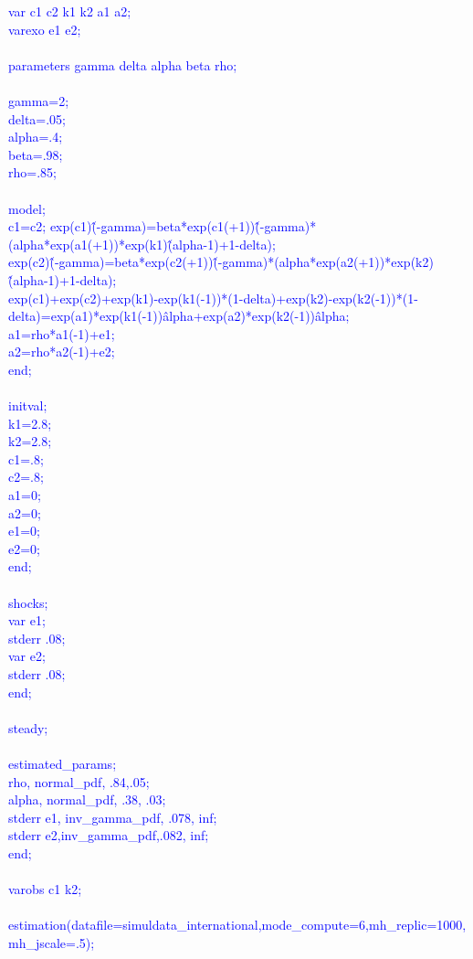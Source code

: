 \documentclass[a4paper,12pt]{scrartcl} %
\begin{document}
\textcolor{blue}{
var c1 c2 k1 k2 a1 a2;\\
varexo e1 e2;\\
\\
parameters gamma delta alpha beta rho;\\
\\
gamma=2;\\
delta=.05;\\
alpha=.4;\\
beta=.98;\\
rho=.85;\\
\\
model;\\
c1=c2;
exp(c1)\^(-gamma)=beta*exp(c1(+1))\^(-gamma)*(alpha*exp(a1(+1))*exp(k1)\^(alpha-1)+1-delta);\\
exp(c2)\^(-gamma)=beta*exp(c2(+1))\^(-gamma)*(alpha*exp(a2(+1))*exp(k2)\^(alpha-1)+1-delta);\\
exp(c1)+exp(c2)+exp(k1)-exp(k1(-1))*(1-delta)+exp(k2)-exp(k2(-1))*(1-delta)=exp(a1)*exp(k1(-1))\^alpha+exp(a2)*exp(k2(-1))\^alpha;\\
a1=rho*a1(-1)+e1;\\
a2=rho*a2(-1)+e2;\\
end;\\
\\
initval;\\
k1=2.8;\\
k2=2.8;\\
c1=.8;\\
c2=.8;\\
a1=0;\\
a2=0;\\
e1=0;\\
e2=0;\\
end;\\
\\
shocks;\\
var e1;\\
stderr .08;\\
var e2;\\
stderr .08;\\
end;\\
\\
steady;\\
\\
estimated\_params;\\
rho, normal\_pdf, .84,.05;\\
alpha, normal\_pdf, .38, .03;\\
stderr e1, inv\_gamma\_pdf, .078, inf;\\
stderr e2,inv\_gamma\_pdf,.082, inf;\\
end;\\
\\
varobs c1 k2;\\
\\
estimation(datafile=simuldata\_international,mode\_compute=6,mh\_replic=1000,mh\_jscale=.5);}\\
\end{document}
